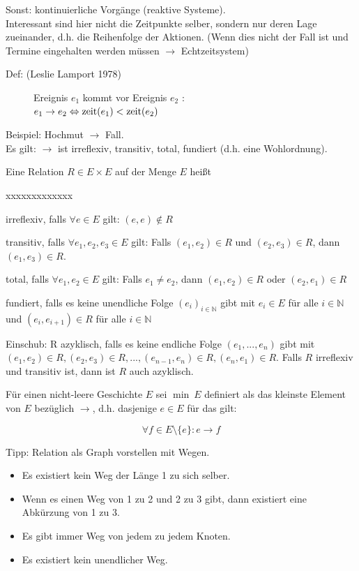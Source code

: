 Sonst: kontinuierliche Vorgänge (reaktive Systeme).\\
Interessant sind hier nicht die Zeitpunkte selber, sondern nur deren Lage zueinander, d.h. die Reihenfolge der Aktionen. (Wenn dies nicht der Fall ist und Termine eingehalten werden müssen $ \rightarrow $ Echtzeitsystem)

\begin{description}
	\item[Def: (Leslie Lamport 1978)] Ereignis $ e_1 $ kommt vor Ereignis $ e_2 $ :\\
	$ e_1 \rightarrow e_2 \Leftrightarrow \operatorname{zeit}(e_1) < \operatorname{zeit}(e_2) $
\end{description}

Beispiel: Hochmut  $ \rightarrow $ Fall.\\
Es gilt: $ \rightarrow $ ist irreflexiv, transitiv, total, fundiert (d.h. eine Wohlordnung).

Eine Relation $ R \in E \times E $ auf der Menge $ E $ heißt
\begin{labeling}{xxxxxxxxxxxxx}
	\item[irreflexiv,] falls $ \forall e \in E $ gilt: $ (e, e) \notin  R $
	\item[transitiv,] falls $ \forall e_1, e_2, e_3 \in E $ gilt: Falls $ (e_1, e_2) \in R $ und $ (e_2, e_3) \in R $, dann $ (e_1, e_3) \in R $.
	\item[total,] falls $ \forall e_1, e_2 \in E $ gilt: Falls $ e_1 \neq e_2 $, dann $(e_1, e_2) \in R $ oder $ (e_2, e_1) \in R $
	\item[fundiert,] falls es keine unendliche Folge $ (e_i)_{i \in \mathbb{N}} $ gibt mit $ e_i \in E $ für alle $ i \in \mathbb{N} $ und $ (e_i, e_{i + 1}) \in R $ für alle $ i \in \mathbb{N} $
\end{labeling}

Einschub: R azyklisch, falls es keine endliche Folge $ (e_1, ..., e_n) $ gibt mit $ (e_1, e_2) \in R, (e_2, e_3) \in R, ..., (e_{n - 1}, e_n) \in R, (e_n, e_1) \in R $.
Falls $ R $ irreflexiv und transitiv ist, dann ist $ R $ auch azyklisch.

Für einen nicht-leere Geschichte $ E $ sei $ \min \ E $ definiert als das kleinste Element von $ E $ bezüglich $ \rightarrow $, d.h. dasjenige $ e \in E $ für das gilt:

\begin{equation*}
	\forall f \in E\setminus\{e\}: e \rightarrow f
\end{equation*}

Tipp: Relation als Graph vorstellen mit Wegen.
\begin{itemize}
	\item Es existiert kein Weg der Länge 1 zu sich selber.
	\item Wenn es einen Weg von 1 zu 2 und 2 zu 3 gibt, dann existiert eine Abkürzung von 1 zu 3.
	\item Es gibt immer Weg von jedem zu jedem Knoten.
	\item Es existiert kein unendlicher Weg.
\end{itemize}

